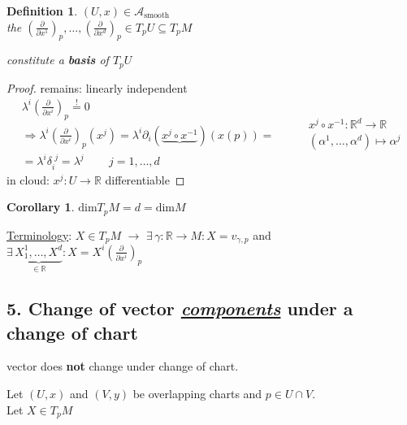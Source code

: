 \documentclass[10pt, twoside]{amsart}
\newtheorem{corollary}{Corollary}
\newtheorem{definition}{Definition}
\begin{document}
\begin{multicols*}{2}
\begin{definition}
  $(U,x) \in \mathcal{A}_{\text{smooth}}$ \\
the $\left( \frac{ \partial }{ \partial x^1} \right)_p , \dots , \left( \frac{ \partial }{ \partial x^d} \right)_p \in T_pU \subseteq T_pM$

constitute a \textbf{basis} of $T_pU$

\end{definition}

\begin{proof} remains: linearly independent 
  \[
\begin{gathered}
\lambda^i \left( \frac{ \partial }{ \partial x^i} \right)_p \overset{!}{=} 0  \\
 \Longrightarrow \lambda^i \left( \frac{ \partial }{ \partial x^i} \right)_p(x^j) = \lambda^i \partial_i (\underbrace{ x^j \circ x^{-1} }_{} )( x(p)) = \\
 = \lambda^i \delta_i^{\,\,j} = \lambda^j \quad \quad \, j = 1 , \dots , d
\end{gathered} \quad \quad \, \begin{gathered}
  x^j \circ x^{-1} : \mathbb{R}^d \to \mathbb{R} \\
  (\alpha^1 , \dots , \alpha^d) \mapsto \alpha^j 
\end{gathered}
\]
in cloud: $x^j : U \to \mathbb{R}$ differentiable




\end{proof}


\begin{corollary}
 $ \text{dim}T_pM = d = \text{dim}M$
\end{corollary}

\underline{Terminology}: $X \in T_pM$ $\to $ $\exists \, \gamma : \mathbb{R} \to M : X = v_{\gamma,p}$ and \\
 $\exists \, \underbrace{ X_1^1 , \dots , X^d }_{\in \mathbb{R} } : X = X^i \left( \frac{ \partial }{ \partial x^i} \right)_p$



\subsection{5. Change of vector \emph{\underline{components}} under a change of chart}

 vector does \textbf{not} change under change of chart.

Let $(U,x)$ and $(V,y)$ be overlapping charts and $p \in U\cap V$.  \\
Let $X \in T_pM$


\end{multicols*}
\end{document}
